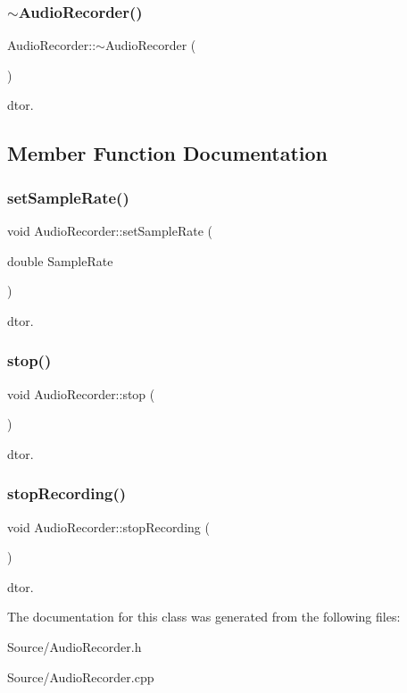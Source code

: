 \subsubsection{\texorpdfstring{$\sim$AudioRecorder()}{~AudioRecorder()}}
{\footnotesize\ttfamily Audio\+Recorder\+::$\sim$\+Audio\+Recorder (\begin{DoxyParamCaption}{ }\end{DoxyParamCaption})}

dtor. 

\subsection{Member Function Documentation}
\mbox{\label{class_audio_recorder_aa01c1566932438251cb5d6e5bb26dd47}} 
\subsubsection{\texorpdfstring{setSampleRate()}{setSampleRate()}}
{\footnotesize\ttfamily void Audio\+Recorder\+::set\+Sample\+Rate (\begin{DoxyParamCaption}\item[{double}]{Sample\+Rate }\end{DoxyParamCaption})}

dtor. \mbox{\label{class_audio_recorder_a07c47c753c1949479c3761bd7c5fe2c2}} 
\subsubsection{\texorpdfstring{stop()}{stop()}}
{\footnotesize\ttfamily void Audio\+Recorder\+::stop (\begin{DoxyParamCaption}{ }\end{DoxyParamCaption})}

dtor. \mbox{\label{class_audio_recorder_a51832d8932daa76e8b742606106f5872}} 
\subsubsection{\texorpdfstring{stopRecording()}{stopRecording()}}
{\footnotesize\ttfamily void Audio\+Recorder\+::stop\+Recording (\begin{DoxyParamCaption}{ }\end{DoxyParamCaption})}

dtor. 

The documentation for this class was generated from the following files\+:\begin{DoxyCompactItemize}
\item 
Source/Audio\+Recorder.\+h\item 
Source/Audio\+Recorder.\+cpp\end{DoxyCompactItemize}
